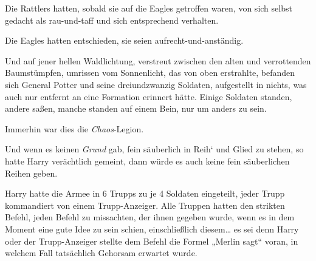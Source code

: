 Die Rattlers hatten, sobald sie auf die Eagles getroffen waren, von sich selbst gedacht als rau-und-taff und sich entsprechend verhalten.

Die Eagles hatten entschieden, sie seien aufrecht-und-anständig.

Und auf jener hellen Waldlichtung, verstreut zwischen den alten und verrottenden Baumstümpfen, umrissen vom Sonnenlicht, das von oben erstrahlte, befanden sich General Potter und seine dreiundzwanzig Soldaten, aufgestellt in nichts, was auch nur entfernt an eine Formation erinnert hätte. Einige Soldaten standen, andere saßen, manche standen auf einem Bein, nur um anders zu sein.

Immerhin war dies die \emph{Chaos}-Legion.

Und wenn es keinen \emph{Grund} gab, fein säuberlich in Reih` und Glied zu stehen, so hatte Harry verächtlich gemeint, dann würde es auch keine fein säuberlichen Reihen geben.

Harry hatte die Armee in 6 Trupps zu je 4 Soldaten eingeteilt, jeder Trupp kommandiert von einem Trupp-Anzeiger. Alle Truppen hatten den strikten Befehl, jeden Befehl zu missachten, der ihnen gegeben wurde, wenn es in dem Moment eine gute Idee zu sein schien, einschließlich diesem… es sei denn Harry oder der Trupp-Anzeiger stellte dem Befehl die Formel „Merlin sagt“ voran, in welchem Fall tatsächlich Gehorsam erwartet wurde.%

